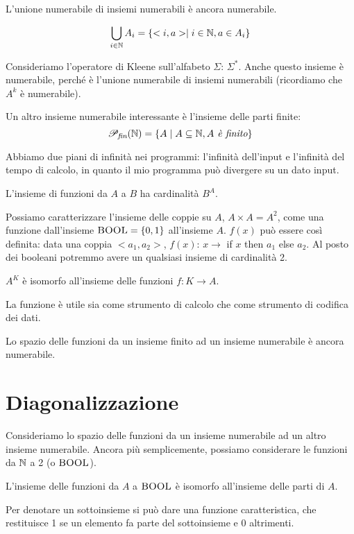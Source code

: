 L'unione numerabile di insiemi numerabili è ancora numerabile.

\begin{equation*}
    \bigcup_{i \in \mathbb{N}} A_{i} = \{<i,a> \mid i \in \mathbb{N}, a \in A_{i}\}
\end{equation*}

Consideriamo l'operatore di Kleene sull'alfabeto $\Sigma$: $\Sigma^{*}$. Anche questo insieme è
numerabile, perché è l'unione numerabile di insiemi numerabili (ricordiamo che $A^{k}$ è numerabile).

Un altro insieme numerabile interessante è l'insieme delle parti finite:
\begin{equation*}
    \mathscr{P}_{\textit{fin}}(\mathbb{N}) = \{A \mid A \subseteq \mathbb{N}, \textit{$A$  è finito}\}
\end{equation*}

Abbiamo due piani di infinità nei programmi: l'infinità dell'input e l'infinità del tempo di
calcolo, in quanto il mio programma può divergere su un dato input.

L'insieme di funzioni da $A$ a $B$ ha cardinalità $B^{A}$.

Possiamo caratterizzare l'insieme delle coppie su $A$, $A \times A = A^{2}$, come una funzione
dall'insieme $\bm{\textsc{BOOL}} = \{0,1\}$ all'insieme $A$. $f(x)$ può essere così definita: data
una coppia $<a_{1},a_{2}>$, $f(x)$: $ x \to $ if $x$ then $a_{1}$ else $a_{2}$. Al posto dei booleani potremmo
avere un qualsiasi insieme di cardinalità 2.

$A^{K}$ è isomorfo all'insieme delle funzioni $f: K \to A$.

La funzione è utile sia come strumento di calcolo che come strumento di codifica dei dati.

Lo spazio delle funzioni da un insieme finito ad un insieme numerabile è ancora numerabile.

\section{Diagonalizzazione}

Consideriamo lo spazio delle funzioni da un insieme numerabile ad un altro insieme numerabile.
Ancora più semplicemente, possiamo considerare le funzioni da $\mathbb{N}$ a 2 (o $\bm{\textsc{BOOL}}$).

L'insieme delle funzioni da $A$ a $\bm{\textsc{BOOL}}$ è isomorfo all'insieme delle parti di $A$.

Per denotare un sottoinsieme si può dare una funzione caratteristica, che restituisce 1 se un
elemento fa parte del sottoinsieme e 0 altrimenti.

